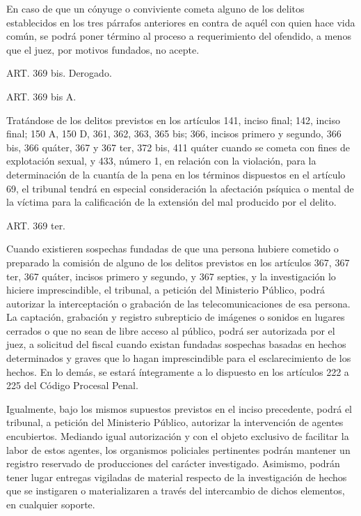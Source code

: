     En caso de que un cónyuge o conviviente cometa alguno de los delitos establecidos en los tres párrafos anteriores en contra de aquél con quien hace vida común, se podrá poner término al proceso a requerimiento del ofendido, a menos que el juez, por motivos fundados, no acepte.




    ART. 369 bis. Derogado.



    ART. 369 bis A.

    Tratándose de los delitos previstos en los artículos 141, inciso final; 142, inciso final; 150 A, 150 D, 361, 362, 363, 365 bis; 366, incisos primero y segundo, 366 bis, 366 quáter, 367 y 367 ter, 372 bis, 411 quáter cuando se cometa con fines de explotación sexual, y 433, número 1, en relación con la violación, para la determinación de la cuantía de la pena en los términos dispuestos en el artículo 69, el tribunal tendrá en especial consideración la afectación psíquica o mental de la víctima para la calificación de la extensión del mal producido por el delito.


    ART. 369 ter.

    Cuando existieren sospechas fundadas de que una persona hubiere cometido o preparado la comisión de alguno de los delitos previstos en los artículos 367, 367 ter, 367 quáter, incisos primero y segundo, y 367 septies, y la investigación lo hiciere imprescindible, el tribunal, a petición del Ministerio Público, podrá autorizar la interceptación o grabación de las telecomunicaciones de esa persona. La captación, grabación y registro subrepticio de imágenes o sonidos en lugares cerrados o que no sean de libre acceso al público, podrá ser autorizada por el juez, a solicitud del fiscal cuando existan fundadas sospechas basadas en hechos determinados y graves que lo hagan imprescindible para el esclarecimiento de los hechos. En lo demás, se estará íntegramente a lo dispuesto en los artículos 222 a 225 del Código Procesal Penal.

    Igualmente, bajo los mismos supuestos previstos en el inciso precedente, podrá el tribunal, a petición del Ministerio Público, autorizar la intervención de agentes encubiertos. Mediando igual autorización y con el objeto exclusivo de facilitar la labor de estos agentes, los organismos policiales pertinentes podrán mantener un registro reservado de producciones del carácter investigado. Asimismo, podrán tener lugar entregas vigiladas de material respecto de la investigación de hechos que se instigaren o materializaren a través del intercambio de dichos elementos, en cualquier soporte.

